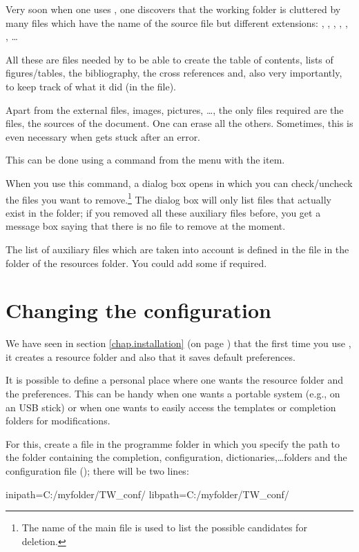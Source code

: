 Very soon when one uses {\AllTeX}, one discovers that the working folder is cluttered by many files which have the name of the source file but different extensions: , , , , , , \dots

All these are files needed by {\AllTeX} to be able to create the table of contents, lists of figures/tables, the bibliography, the cross references and, also very importantly, to keep track of what it did (in the  file).

Apart from the external files, images, pictures, \dots, the only files required are the  files, the sources of the document. One can erase all the others. Sometimes, this is even necessary when {\AllTeX} gets stuck after an error.

This can be done using a {\Tw} command from the  menu with the \submenu{} item.

When you use this command, a dialog box opens in which you can check/uncheck the files you want to remove.\footnote{The name of the main file is used to list the possible candidates for deletion.} The dialog box will only list files that actually exist in the folder; if you removed all these auxiliary files before, you get a message box saying that there is no file to remove at the moment.

The list of auxiliary files which are taken into account is defined in the file  in the  folder of the {\Tw} resources folder. You could add some if required.

\section{Changing the configuration}

We have seen in section \ref{chap.installation} (on page \pageref{chap.installation}) that the first time you use {\Tw}, it creates a resource folder and also that it saves default preferences.

It is possible to define a personal place where one wants the resource folder and the preferences. This can be handy when one wants a portable system (e.g., on an USB stick) or when one wants to easily access the templates or completion folders for modifications.

For this, create a file  in the programme folder in which you specify the path to the folder containing the completion, configuration, dictionaries,\dots folders and the configuration file (); there will be two lines:
\begin{verbExample}
inipath=C:/myfolder/TW_conf/
libpath=C:/myfolder/TW_conf/
\end{verbExample}

